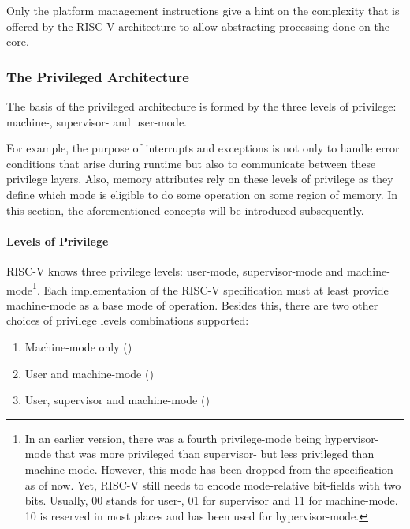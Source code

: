 Only the platform management instructions give a hint on the complexity that is offered by the RISC-V architecture to allow abstracting processing done on the core.

\subsubsection{The Privileged Architecture}
\label{sec:rv-priv-arch}

The basis of the privileged architecture is formed by the three levels of privilege: machine-, supervisor- and user-mode.

For example, the purpose of interrupts and exceptions is not only to handle error conditions that arise during runtime but also to communicate between these privilege layers.
Also, memory attributes rely on these levels of privilege as they define which mode is eligible to do some operation on some region of memory.
In this section, the aforementioned concepts will be introduced subsequently.

\paragraph{Levels of Privilege}

RISC-V knows three privilege levels: user-mode, supervisor-mode and machine-mode\footnote{%
    In an earlier version, there was a fourth privilege-mode being hypervisor-mode that was more privileged than supervisor- but less privileged than machine-mode.
    However, this mode has been dropped from the specification as of now.
    Yet, RISC-V still needs to encode mode-relative bit-fields with two bits.
    Usually, 00 stands for user-, 01 for supervisor and 11 for machine-mode.
    10 is reserved in most places and has been used for hypervisor-mode.
}.
Each implementation of the RISC-V specification must at least provide machine-mode as a base mode of operation.
Besides this, there are two other choices of privilege levels combinations supported:
\begin{enumerate}
    \item Machine-mode only ()
    \item User and machine-mode ()
    \item User, supervisor and machine-mode ()
\end{enumerate}

